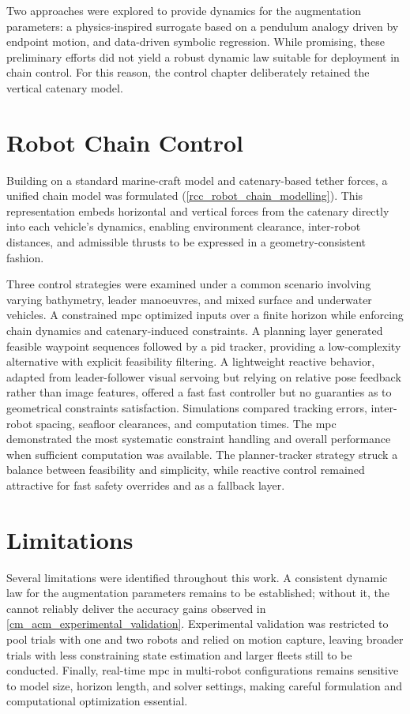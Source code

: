 Two approaches were explored to provide dynamics for the augmentation parameters: a
physics-inspired surrogate based on a pendulum analogy driven by endpoint motion, and data-driven
symbolic regression. While promising, these preliminary efforts did not yield a robust dynamic law
suitable for deployment in chain control. For this reason, the control chapter deliberately
retained the vertical catenary model.

\section{Robot Chain Control}
\label{c_robot_chain_control}

Building on a standard marine-craft model and catenary-based tether forces, a unified chain model
was formulated (\cref{rcc_robot_chain_modelling}). This representation embeds horizontal and
vertical forces from the catenary directly into each vehicle's dynamics, enabling environment
clearance, inter-robot distances, and admissible thrusts to be expressed in a geometry-consistent
fashion.

Three control strategies were examined under a common scenario involving varying bathymetry, leader
manoeuvres, and mixed surface and underwater vehicles. A constrained \ac{mpc} optimized inputs over
a finite horizon while enforcing chain dynamics and catenary-induced constraints. A planning layer
generated feasible waypoint sequences followed by a \ac{pid} tracker, providing a low-complexity
alternative with explicit feasibility filtering. A lightweight reactive behavior, adapted from
leader-follower visual servoing but relying on relative pose feedback rather than image features,
offered a fast fast controller but no guaranties as to geometrical constraints satisfaction.
Simulations compared tracking errors, inter-robot spacing, seafloor clearances, and computation
times. The \ac{mpc} demonstrated the most systematic constraint handling and overall performance
when sufficient computation was available. The planner-tracker strategy struck a balance between
feasibility and simplicity, while reactive control remained attractive for fast safety overrides
and as a fallback layer.

\section{Limitations}
\label{c_limitations}

Several limitations were identified throughout this work. A consistent dynamic law for the
augmentation parameters remains to be established; without it, the \augmentedmodel{} cannot
reliably deliver the accuracy gains observed in \cref{cm_acm_experimental_validation}. Experimental
validation was restricted to pool trials with one and two robots and relied on motion capture,
leaving broader trials with less constraining state estimation and larger fleets still to be
conducted. Finally, real-time \ac{mpc} in multi-robot configurations remains sensitive to model
size, horizon length, and solver settings, making careful formulation and computational
optimization essential.

